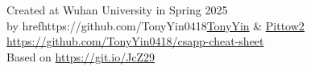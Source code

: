 \documentclass[twocolumn]{article}
\begin{document}


\vfill

\vfill
\begin{center}
    Created at Wuhan University in Spring 2025\\
    by href{https://github.com/TonyYin0418}{\underline{TonyYin}} \& \href{https://github.com/Pittow2}{\underline{Pittow2}}\\
    \url{https://github.com/TonyYin0418/csapp-cheat-sheet}\\
    Based on \url{https://git.io/JcZ29}
\end{center}
\end{document}
